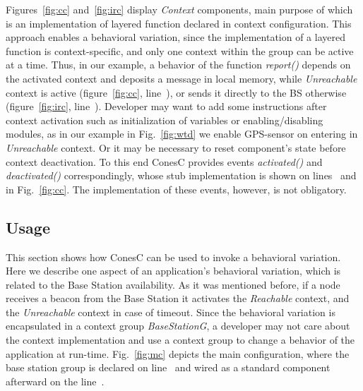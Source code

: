 
Figures~\ref{fig:cc} and~\ref{fig:irc} display \emph{Context} components, main
purpose of which is an implementation of layered function declared in context configuration. 
This approach enables a behavioral variation, since the implementation of a layered function is
context-specific, and only one context within the group can be active at a time. Thus, in our
example, a behavior of the function \emph{report()} depends on the activated context and
deposits a message in local memory, while \emph{Unreachable} context
is active (figure~\ref{fig:cc}, line~),
or sends it directly to the BS otherwise (figure~\ref{fig:irc}, line~).
Developer may want to add some instructions after
context activation such as initialization of variables or enabling/disabling
modules, as in our example in Fig.~\ref{fig:wtd} we enable GPS-sensor on entering
in \emph{Unreachable} context. Or it may be necessary to reset component's state before context
deactivation. To this end ConesC provides events \emph{activated()} and
\emph{deactivated()} correspondingly, whose stub implementation is shown on
lines~ and~ in Fig.~\ref{fig:cc}. The implementation of
these events, however, is not obligatory.


\subsection{Usage}

This section shows how ConesC can be used to invoke a behavioral
variation. Here we describe one aspect of an application's behavioral variation,
which is related to the Base Station availability. As it was mentioned before,
if a node receives a beacon from the Base Station it activates the \emph{Reachable}
context, and the \emph{Unreachable} context in case of timeout.
Since the behavioral variation is encapsulated in a context group \emph{BaseStationG},
a developer may not care about the context implementation and use a context group
to change a behavior of the application at run-time. Fig.~\ref{fig:mc} depicts the main
configuration, where the base station group is declared on line~ and wired
as a standard component afterward on the line~.


